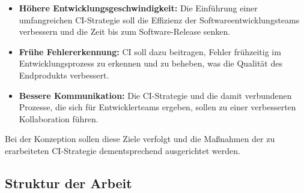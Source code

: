 \begin{itemize}
    \item \textbf{Höhere Entwicklungsgeschwindigkeit:} Die Einführung einer umfangreichen CI-Strategie soll die
          Effizienz der Softwareentwicklungsteams verbessern und die Zeit bis zum Software-Release senken.

    \item \textbf{Frühe Fehlererkennung:} CI soll dazu beitragen, Fehler frühzeitig im Entwicklungsprozess zu erkennen
          und zu beheben, was die Qualität des Endprodukts verbessert.

    \item \textbf{Bessere Kommunikation:} Die CI-Strategie und die damit verbundenen Prozesse, die sich für
          Entwicklerteams ergeben, sollen zu einer verbesserten Kollaboration führen.
\end{itemize}

Bei der Konzeption sollen diese Ziele verfolgt und die Maßnahmen der zu erarbeiteten CI-Strategie dementsprechend
ausgerichtet werden.

\subsection{Struktur der Arbeit} \label{subsec:01-introduction-3}

\clearpage
